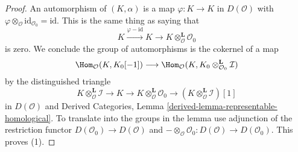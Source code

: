 \begin{proof}
An automorphism of $(K, \alpha)$ is a map $\varphi : K \to K$
in $D(\mathcal{O})$ with
$\varphi \otimes_\mathcal{O} \text{id}_{\mathcal{O}_0} = \text{id}$.
This is the same thing as saying that
$$
K \xrightarrow{\varphi - \text{id}} K \to
K \otimes_\mathcal{O}^\mathbf{L} \mathcal{O}_0
$$
is zero. We conclude the group of automorphisms is
the cokernel of a map
$$
\Hom_\mathcal{O}(K, K_0[-1])
\longrightarrow
\Hom_\mathcal{O}(K, K_0 \otimes_{\mathcal{O}_0}^\mathbf{L} \mathcal{I})
$$
by the distinguished triangle
$$
K \otimes_\mathcal{O}^\mathbf{L} \mathcal{I} \to
K \to
K \otimes_\mathcal{O}^\mathbf{L} \mathcal{O}_0 \to
(K \otimes_\mathcal{O}^\mathbf{L} \mathcal{I})[1]
$$
in $D(\mathcal{O})$ and 
Derived Categories, Lemma \ref{derived-lemma-representable-homological}.
To translate into the groups in the lemma use adjunction
of the restriction functor $D(\mathcal{O}_0) \to D(\mathcal{O})$ and
$- \otimes_\mathcal{O} \mathcal{O}_0 : D(\mathcal{O}) \to D(\mathcal{O}_0)$.
This proves (1).


\end{proof}
